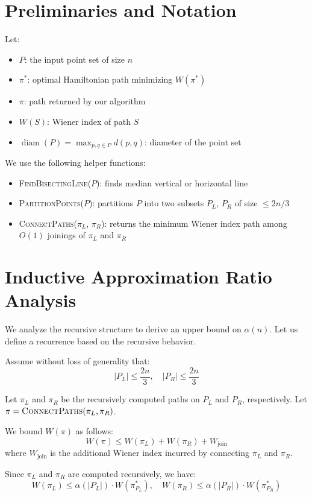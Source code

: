 \documentclass[11pt]{article}
\begin{document}
\section{Preliminaries and Notation}

Let:

\begin{itemize}
  \item $P$: the input point set of size $n$
  \item $\pi^*$: optimal Hamiltonian path minimizing $W(\pi^*)$
  \item $\pi$: path returned by our algorithm
  \item $W(S)$: Wiener index of path $S$
  \item $\operatorname{diam}(P) = \max_{p,q \in P} d(p,q)$: diameter of the point set
\end{itemize}

We use the following helper functions:
\begin{itemize}
  \item \textsc{FindBisectingLine}($P$): finds median vertical or horizontal line
  \item \textsc{PartitionPoints}($P$): partitions $P$ into two subsets $P_L$, $P_R$ of size $\leq 2n/3$
  \item \textsc{ConnectPaths}($\pi_L$, $\pi_R$): returns the minimum Wiener index path among $O(1)$ joinings of $\pi_L$ and $\pi_R$
\end{itemize}

\section{Inductive Approximation Ratio Analysis}

We analyze the recursive structure to derive an upper bound on $\alpha(n)$. Let us define a recurrence based on the recursive behavior.

Assume without loss of generality that:
\[
  |P_L| \leq \frac{2n}{3}, \quad |P_R| \leq \frac{2n}{3}
\]

Let $\pi_L$ and $\pi_R$ be the recursively computed paths on $P_L$ and $P_R$, respectively. Let $\pi = \textsc{ConnectPaths}(\pi_L, \pi_R)$.

We bound $W(\pi)$ as follows:
\[
  W(\pi) \leq W(\pi_L) + W(\pi_R) + W_{\text{join}}
\]
where $W_{\text{join}}$ is the additional Wiener index incurred by connecting $\pi_L$ and $\pi_R$.

Since $\pi_L$ and $\pi_R$ are computed recursively, we have:
\[
  W(\pi_L) \leq \alpha(|P_L|) \cdot W(\pi^*_{P_L}), \quad W(\pi_R) \leq \alpha(|P_R|) \cdot W(\pi^*_{P_R})
\]
\end{document}
